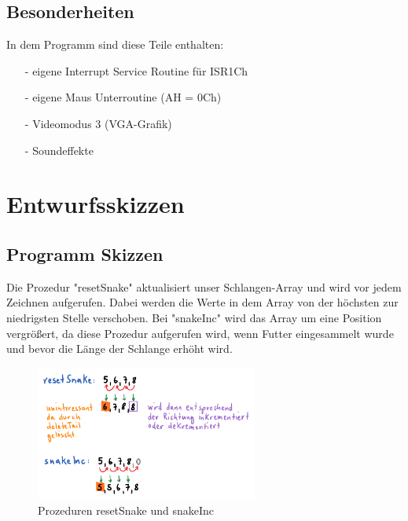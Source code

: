 \documentclass[a4paper,10pt]{article}
\begin{document}
		\subsection{Besonderheiten}
			In dem Programm sind diese Teile enthalten:
			\begin{itemize}
				\item[-] eigene Interrupt Service Routine für ISR1Ch
				\item[-] eigene Maus Unterroutine (AH = 0Ch)
				\item[-] Videomodus 3 (VGA-Grafik)
				\item[-] Soundeffekte
			\end{itemize}
		\newpage
	\section{Entwurfsskizzen}
		
		\subsection{Programm Skizzen}
			Die Prozedur "resetSnake" \- aktualisiert unser Schlangen-Array und 
			wird vor jedem Zeichnen aufgerufen. Dabei werden die Werte in dem 
			Array von der höchsten zur niedrigsten Stelle verschoben.
			Bei "snakeInc" \- wird das Array um eine Position vergrößert, da 
			diese Prozedur aufgerufen wird, wenn Futter eingesammelt wurde und 
			bevor die Länge der Schlange erhöht wird.\\
			\begin{figure}[h]
				\centering
				\includegraphics[width=0.65\textwidth]{prog}
				\caption{Prozeduren resetSnake und snakeInc}
				\label{SnakPro}
			\end{figure}
			
\end{document}
